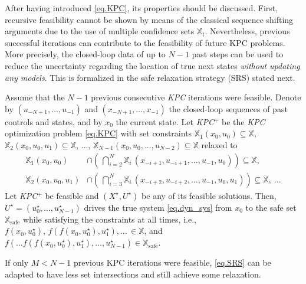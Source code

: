 After having introduced \eqref{eq.KPC}, its properties should be discussed. First, recursive feasibility cannot be shown by means of the classical sequence shifting arguments due to the use of multiple confidence sets $\mathbb{X}_t$. Nevertheless, previous successful iterations can contribute to the feasibility of future KPC problems. More precisely, the closed-loop data of up to $N-1$ past steps can be used to reduce the uncertainty regarding the location of true next states \textit{without updating any models}. This is formalized in the safe relaxation strategy (SRS) stated next.

\begin{proposition}
	Assume that the $N-1$ previous consecutive \emph{KPC} iterations were feasible. Denote by $(u_{-N+1}, \dots, u_{-1})$ and $(x_{-N+1}, \dots, x_{-1})$ the closed-loop sequences of past controls and states, and by $x_0$ the current state. Let \emph{KPC}$^+$ be the \emph{KPC} optimization problem \eqref{eq.KPC} with set constraints $\mathbb{X}_1(x_0,u_0) \subseteq \mathbb{X}$, $\mathbb{X}_2(x_0,u_0,u_1) \subseteq \mathbb{X}$, $\dots$, $\mathbb{X}_{N-1}(x_0,u_0,\dots,u_{N-2}) \subseteq \mathbb{X}$ relaxed to
	\begin{equation}
		\label{eq.SRS}
		\begin{aligned}
			\mathbb{X}_1(x_0,u_0) &\cap \left( \, \bigcap_{i = 2}^{N} \mathbb{X}_{i} \, (x_{-i+1},u_{-i+1},\dots,u_{-1},u_0) \right) \subseteq \mathbb{X}, \\
			\mathbb{X}_2(x_0,u_0,u_{1}) &\cap \left( \, \bigcap_{i=3}^N \mathbb{X}_{i} \, (x_{-i+2},u_{-i+2},\dots,u_{-1},u_0,u_1) \right) \subseteq \mathbb{X}, \ \dots
		\end{aligned}
	\end{equation}
	Let \emph{KPC}$^+$ be feasible and $(X^\star,U^\star)$ be any of its feasible solutions. Then, $U^\star = (u_0^\star, \dots, u_{N-1}^\star)$ drives the true system \eqref{eq.dyn_sys} from $x_0$ to the safe set $\mathbb{X}_{\text{safe}}$ while satisfying the constraints at all times, i.e., $f(x_0,u_0^\star), \, f(f(x_0,u_0^\star),u_1^\star), \dots \, \in \mathbb{X}$, and $f(\dots f(f(x_0,u_0^\star),u_1^\star),\dots,u_{N-1}^\star) \in \mathbb{X}_{\text{safe}}$.
	\label{prop.SRS}
\end{proposition}

\begin{remark}
If only $M < N-1$ previous KPC iterations were feasible, \eqref{eq.SRS} can be adapted to have less set intersections and still achieve some relaxation.
\end{remark}

